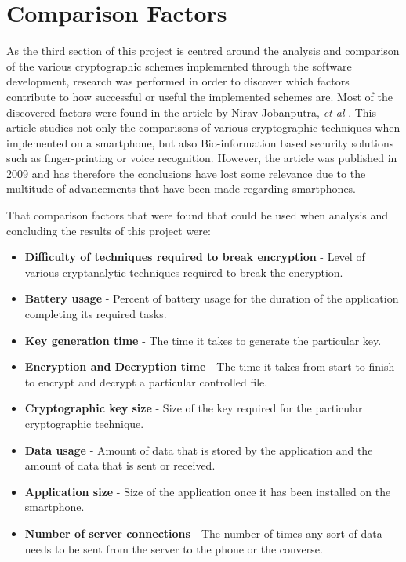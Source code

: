 \documentclass[a4paper,10pt]{report}
\begin{document}
\section{Comparison Factors}

As the third section of this project is centred around the analysis and comparison of the various cryptographic schemes implemented through the software development, research was performed in order to discover which factors contribute to how successful or useful the implemented schemes are. Most of the discovered factors were found in the article by Nirav Jobanputra, \textit{et al} \cite{ejeta}. This article studies not only the comparisons of various cryptographic techniques when implemented on a smartphone, but also Bio-information based security solutions such as finger-printing or voice recognition. However, the article was published in 2009 and has therefore the conclusions have lost some relevance due to the multitude of advancements that have been made regarding smartphones. 

That comparison factors that were found that could be used when analysis and concluding the results of this project were:

\begin{itemize}
 \item \textbf{Difficulty of techniques required to break encryption} - Level of various cryptanalytic techniques required to break the encryption. 
 \item \textbf{Battery usage} - Percent of battery usage for the duration of the application completing its required tasks. 
 \item \textbf{Key generation time} - The time it takes to generate the particular key.
 \item \textbf{Encryption and Decryption time} - The time it takes from start to finish to encrypt and decrypt a particular controlled file. 
 \item \textbf{Cryptographic key size} - Size of the key required for the particular cryptographic technique. 
 \item \textbf{Data usage} - Amount of data that is stored by the application and the amount of data that is sent or received. 
 \item \textbf{Application size} - Size of the application once it has been installed on the smartphone. 
 \item \textbf{Number of server connections} - The number of times any sort of data needs to be sent from the server to the phone or the converse.   
\end{itemize}
\end{document}

